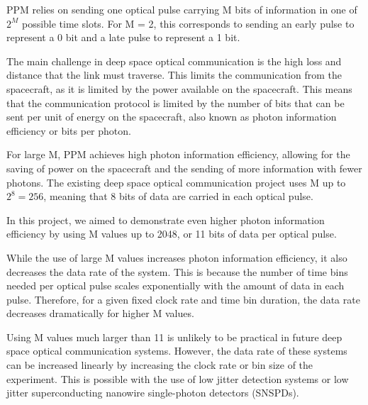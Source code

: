 \documentclass[11pt]{caltech_thesis} %
\begin{document}
PPM relies on sending one optical pulse carrying M bits of information
in one of \(2^M\) possible time slots. For M = 2, this corresponds to
sending an early pulse to represent a 0 bit and a late pulse to
represent a 1 bit.

The main challenge in deep space optical communication is the high loss
and distance that the link must traverse. This limits the communication
from the spacecraft, as it is limited by the power available on the
spacecraft. This means that the communication protocol is limited by the
number of bits that can be sent per unit of energy on the spacecraft,
also known as photon information efficiency or bits per photon.

For large M, PPM achieves high photon information efficiency, allowing
for the saving of power on the spacecraft and the sending of more
information with fewer photons. The existing deep space optical
communication project uses M up to \(2^8 = 256\), meaning that 8 bits of
data are carried in each optical pulse.

In this project, we aimed to demonstrate even higher photon information
efficiency by using M values up to 2048, or 11 bits of data per optical
pulse.

While the use of large M values increases photon information efficiency,
it also decreases the data rate of the system. This is because the
number of time bins needed per optical pulse scales exponentially with
the amount of data in each pulse. Therefore, for a given fixed clock
rate and time bin duration, the data rate decreases dramatically for
higher M values.

Using M values much larger than 11 is unlikely to be practical in future
deep space optical communication systems. However, the data rate of
these systems can be increased linearly by increasing the clock rate or
bin size of the experiment. This is possible with the use of low jitter
detection systems or low jitter superconducting nanowire single-photon
detectors (SNSPDs).
\end{document}
